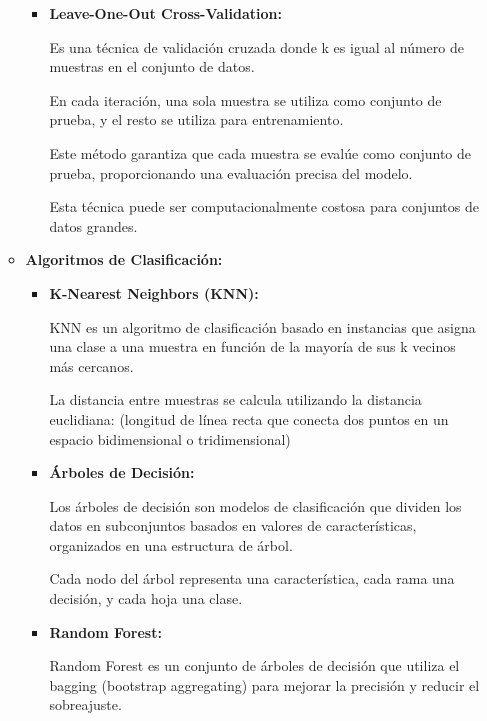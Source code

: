 \begin{enumerate}
\begin{itemize}
\begin{itemize}
	\item
	\textbf{Leave-One-Out Cross-Validation:}
	
	Es una técnica de validación cruzada donde k es igual al número de muestras en el conjunto de datos.
	
	En cada iteración, una sola muestra se utiliza como conjunto de prueba, y el resto se utiliza para entrenamiento.
	
	Este método garantiza que cada muestra se evalúe como conjunto de prueba, proporcionando una evaluación precisa del modelo.
	
	Esta técnica puede ser computacionalmente costosa para conjuntos de datos grandes.
		
	\end{itemize}
	
	
\item
\textbf{Algoritmos de Clasificación:}	
	
	\begin{itemize}
	
	\item
	\textbf{K-Nearest Neighbors (KNN):}
	
	KNN es un algoritmo de clasificación basado en instancias que asigna una clase a una muestra en función de la mayoría de sus k vecinos más cercanos.
	
	La distancia entre muestras se calcula utilizando la distancia euclidiana: (longitud de línea recta que conecta dos puntos en un espacio bidimensional o tridimensional)
	
	
	
	
	

	\item
	\textbf{Árboles de Decisión:}	
	
	Los árboles de decisión son modelos de clasificación que dividen los datos en subconjuntos basados en valores de características, organizados en una estructura de árbol.
	
	Cada nodo del árbol representa una característica, cada rama una decisión, y cada hoja una clase.
	

	
	

	\item
	\textbf{Random Forest:}	
	
	Random Forest es un conjunto de árboles de decisión que utiliza el bagging (bootstrap aggregating) para mejorar la precisión y reducir el sobreajuste.
	

\end{itemize}
\end{itemize}
\end{enumerate}
